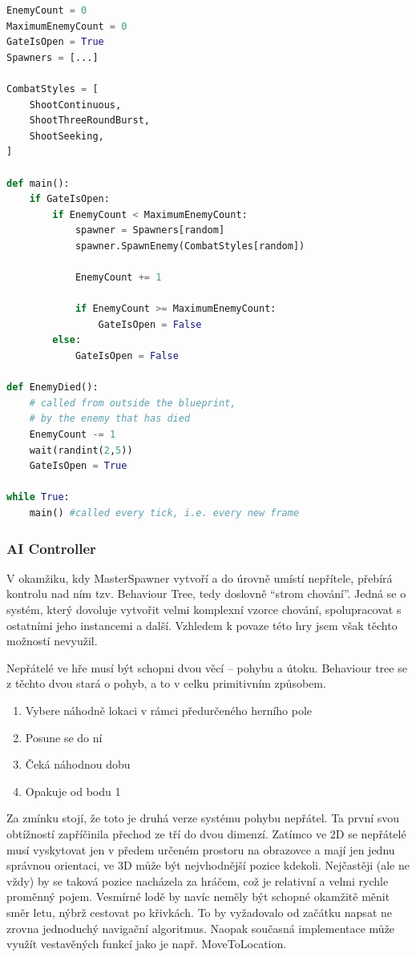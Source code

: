 \documentclass[12pt,a4paper,hidelinks]{article}
\begin{document}
\begin{lstlisting}[language=Python]
EnemyCount = 0
MaximumEnemyCount = 0
GateIsOpen = True
Spawners = [...]

CombatStyles = [
	ShootContinuous,
	ShootThreeRoundBurst,
	ShootSeeking,
]

def main():
	if GateIsOpen:
		if EnemyCount < MaximumEnemyCount:
			spawner = Spawners[random]
			spawner.SpawnEnemy(CombatStyles[random])

			EnemyCount += 1

			if EnemyCount >= MaximumEnemyCount:
				GateIsOpen = False
		else:
			GateIsOpen = False

def EnemyDied():
	# called from outside the blueprint,
	# by the enemy that has died
	EnemyCount -= 1
	wait(randint(2,5))
	GateIsOpen = True

while True:
	main() #called every tick, i.e. every new frame

\end{lstlisting}

\subsubsection{AI Controller}
V okamžiku, kdy MasterSpawner vytvoří a do úrovně umístí nepřítele, přebírá kontrolu nad ním tzv. Behaviour Tree, tedy doslovně \enquote{strom chování}. Jedná se o systém, který dovoluje vytvořit velmi komplexní vzorce chování, spolupracovat s ostatními jeho instancemi a další. Vzhledem k povaze této hry jsem však těchto možností nevyužil.

Nepřátelé ve hře musí být schopni dvou věcí – pohybu a útoku. Behaviour tree se z těchto dvou stará o pohyb, a to v celku primitivním způsobem.
\begin{enumerate}
	\item Vybere náhodně lokaci v rámci předurčeného herního pole
	\item Posune se do ní
	\item Čeká náhodnou dobu
	\item Opakuje od bodu 1
\end{enumerate}

Za zmínku stojí, že toto je druhá verze systému pohybu nepřátel. Ta první svou obtížností zapříčinila přechod ze tří do dvou dimenzí. Zatímco ve 2D se nepřátelé musí vyskytovat jen v předem určeném prostoru na obrazovce a mají jen jednu správnou orientaci, ve 3D může být nejvhodnější pozice kdekoli. Nejčastěji (ale ne vždy) by se taková pozice nacházela za hráčem, což je relativní a velmi rychle proměnný pojem. Vesmírné lodě by navíc neměly být schopné okamžitě měnit směr letu, nýbrž cestovat po křivkách. To by vyžadovalo od začátku napsat ne zrovna jednoduchý navigační algoritmus. Naopak současná implementace může využít vestavěných funkcí jako je např. MoveToLocation\cite{uedocs:moveto}.
\end{document}
